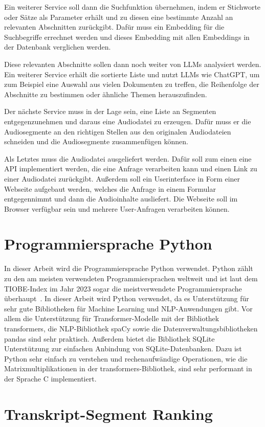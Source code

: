 Ein weiterer Service soll dann die Suchfunktion übernehmen, indem er Stichworte oder Sätze als Parameter erhält und zu diesen eine bestimmte Anzahl an relevanten Abschnitten zurückgibt.
Dafür muss ein Embedding für die Suchbegriffe errechnet werden und dieses Embedding mit allen Embeddings in der Datenbank verglichen werden.

Diese relevanten Abschnitte sollen dann noch weiter von LLMs analysiert werden.
Ein weiterer Service erhält die sortierte Liste und nutzt LLMs wie ChatGPT, um zum Beispiel eine Auswahl aus vielen Dokumenten zu treffen, die Reihenfolge der Abschnitte zu bestimmen oder ähnliche Themen herauszufinden.

Der nächste Service muss in der Lage sein, eine Liste an Segmenten entgegenzunehmen und daraus eine Audiodatei zu erzeugen.
Dafür muss er die Audiosegmente an den richtigen Stellen aus den originalen Audiodateien schneiden und die Audiosegmente zusammenfügen können.

Als Letztes muss die Audiodatei ausgeliefert werden.
Dafür soll zum einen eine API implementiert werden, die eine Anfrage verarbeiten kann und einen Link zu einer Audiodatei zurückgibt.
Außerdem soll ein Userinterface in Form einer Webseite aufgebaut werden, welches die Anfrage in einem Formular entgegennimmt und dann die Audioinhalte ausliefert.
Die Webseite soll im Browser verfügbar sein und mehrere User-Anfragen verarbeiten können.
\section{Programmiersprache Python}

In dieser Arbeit wird die Programmiersprache Python verwendet.
Python zählt zu den am meisten verwendeten Programmiersprachen weltweit und ist laut dem TIOBE-Index im Jahr 2023 sogar die meistverwendete Programmiersprache überhaupt~\cite{index2023}.
In dieser Arbeit wird Python verwendet, da es Unterstützung für sehr gute Bibliotheken für Machine Learning und NLP-Anwendungen gibt.
Vor allem die Unterstützung für Transformer-Modelle mit der Bibliothek transformers, die NLP-Bibliothek spaCy sowie die Datenverwaltungsbibliotheken pandas sind sehr praktisch.
Außerdem bietet die Bibliothek SQLite Unterstützung zur einfachen Anbindung von SQLite-Datenbanken.
Dazu ist Python sehr einfach zu verstehen und rechenaufwändige Operationen, wie die Matrixmultiplikationen in der transformers-Bibliothek, sind sehr performant in der Sprache C implementiert.

\section{Transkript-Segment Ranking}

